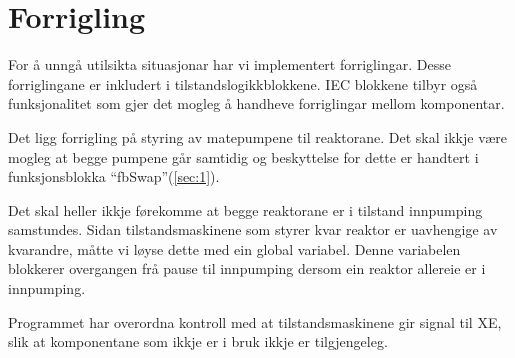 \section{Forrigling}
\thispagestyle{fancy}

For å unngå utilsikta situasjonar har vi implementert forriglingar.
Desse forriglingane er inkludert i tilstandslogikkblokkene.\newline
\gls{IEC} blokkene tilbyr også funksjonalitet som gjer det mogleg å handheve forriglingar mellom komponentar.

Det ligg forrigling på styring av matepumpene til reaktorane. Det skal ikkje være mogleg at begge pumpene går samtidig
og beskyttelse for dette er handtert i funksjonsblokka ``fbSwap''(\ref{sec:1}).

Det skal heller ikkje førekomme at begge reaktorane er i tilstand innpumping samstundes.
Sidan tilstandsmaskinene som styrer kvar reaktor er uavhengige av kvarandre, måtte vi løyse dette med ein
global variabel. Denne variabelen blokkerer overgangen frå pause til innpumping dersom ein reaktor allereie er i innpumping.

Programmet har overordna kontroll med at tilstandsmaskinene gir signal til \gls{XE}, 
slik at komponentane som ikkje er i bruk ikkje er tilgjengeleg.

\newpage






